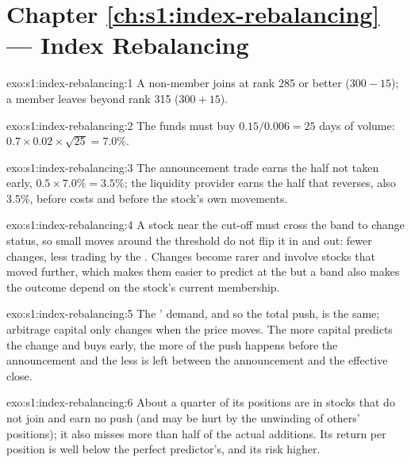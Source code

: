 \section*{Chapter \ref{ch:s1:index-rebalancing} --- Index Rebalancing}

\begin{solution}{exo:s1:index-rebalancing:1}
A non-member joins at rank 285 or better ($300 - 15$); a member leaves beyond rank 315 ($300 + 15$).
\end{solution}

\begin{solution}{exo:s1:index-rebalancing:2}
The funds must buy $0.15/0.006 = 25$ days of volume: $0.7 \times 0.02 \times \sqrt{25} = 7.0\%$.
\end{solution}

\begin{solution}{exo:s1:index-rebalancing:3}
The announcement trade earns the half not taken early, $0.5 \times 7.0\% = 3.5\%$; the liquidity provider earns the half that reverses, also 3.5\%, before
costs and before the stock's own movements.
\end{solution}

\begin{solution}{exo:s1:index-rebalancing:4}
A stock near the cut-off must cross the band to change status, so small moves around the threshold do not flip it in and out: fewer changes, less trading
by the . Changes become rarer and involve stocks that moved further, which makes them easier to predict at the  but a band also makes the
outcome depend on the stock's current membership.
\end{solution}

\begin{solution}{exo:s1:index-rebalancing:5}
The ' demand, and so the total push, is the same; arbitrage capital only changes when the price moves. The more capital predicts the change and
buys early, the more of the push happens before the announcement and the less is left between the announcement and the effective close.
\end{solution}

\begin{solution}{exo:s1:index-rebalancing:6}
About a quarter of its positions are in stocks that do not join and earn no push (and may be hurt by the unwinding of others' positions); it also misses
more than half of the actual additions. Its return per position is well below the perfect predictor's, and its risk higher.
\end{solution}

